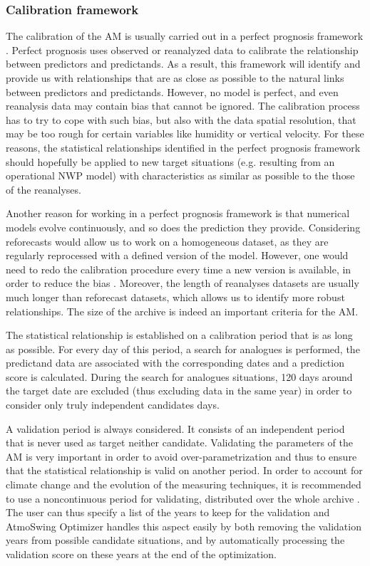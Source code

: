 \documentclass[review]{elsarticle}
\begin{document}
\subsubsection{Calibration framework}
\label{sec:calibration-framework}

The calibration of the AM is usually carried out in a perfect prognosis \citep{Klein1959} framework \citep{Bontron2004, BenDaoud2010}. Perfect prognosis uses observed or reanalyzed data to calibrate the relationship between predictors and predictands. As a result, this framework will identify and provide us with relationships that are as close as possible to the natural links between predictors and predictands. However, no model is perfect, and even reanalysis data may contain bias that cannot be ignored. The calibration process has to try to cope with such bias, but also with the data spatial resolution, that may be too rough for certain variables like humidity or vertical velocity. For these reasons, the statistical relationships identified in the perfect prognosis framework should hopefully be applied to new target situations (e.g. resulting from an operational NWP model) with characteristics as similar as possible to the those of the reanalyses.

Another reason for working in a perfect prognosis framework is that numerical models evolve continuously, and so does the prediction they provide. Considering reforecasts would allow us to work on a homogeneous dataset, as they are regularly reprocessed with a defined version of the model. However, one would need to redo the calibration procedure every time a new version is available, in order to reduce the bias \citep{Wilson2002}. Moreover, the length of reanalyses datasets are usually much longer than reforecast datasets, which allows us to identify more robust relationships. The size of the archive is indeed an important criteria for the AM.

The statistical relationship is established on a calibration period that is as long as possible. For every day of this period, a search for analogues is performed, the predictand data are associated with the corresponding dates and a prediction score is calculated. During the search for analogues situations, 120 days around the target date are excluded (thus excluding data in the same year) in order to consider only truly independent candidates days.

A validation period is always considered. It consists of an independent period that is never used as target neither candidate. Validating the parameters of the AM is very important in order to avoid over-parametrization and thus to ensure that the statistical relationship is valid on another period. In order to account for climate change and the evolution of the measuring techniques, it is recommended to use a noncontinuous period for validating, distributed over the whole archive \citep{BenDaoud2010}. The user can thus specify a list of the years to keep for the validation and AtmoSwing Optimizer handles this aspect easily by both removing the validation years from possible candidate situations, and by automatically processing the validation score on these years at the end of the optimization.
\end{document}
